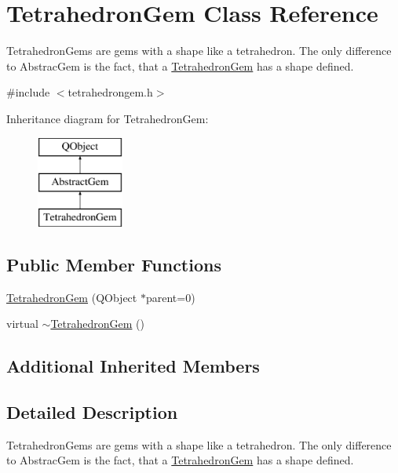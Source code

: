\hypertarget{class_tetrahedron_gem}{\section{Tetrahedron\+Gem Class Reference}
\label{class_tetrahedron_gem}
}


Tetrahedron\+Gems are gems with a shape like a tetrahedron. The only difference to Abstrac\+Gem is the fact, that a \hyperlink{class_tetrahedron_gem}{Tetrahedron\+Gem} has a shape defined.  




{\ttfamily \#include $<$tetrahedrongem.\+h$>$}

Inheritance diagram for Tetrahedron\+Gem\+:\begin{figure}[H]
\begin{center}
\leavevmode
\includegraphics[height=3.000000cm]{class_tetrahedron_gem}
\end{center}
\end{figure}
\subsection*{Public Member Functions}
\begin{DoxyCompactItemize}
\item 
\hyperlink{class_tetrahedron_gem_af942fcb0a4da9b3dfcf989931b2bc393}{Tetrahedron\+Gem} (Q\+Object $\ast$parent=0)
\item 
virtual \hyperlink{class_tetrahedron_gem_ab44903e14715941beda3490914a229ae}{$\sim$\+Tetrahedron\+Gem} ()
\end{DoxyCompactItemize}
\subsection*{Additional Inherited Members}


\subsection{Detailed Description}
Tetrahedron\+Gems are gems with a shape like a tetrahedron. The only difference to Abstrac\+Gem is the fact, that a \hyperlink{class_tetrahedron_gem}{Tetrahedron\+Gem} has a shape defined. 


